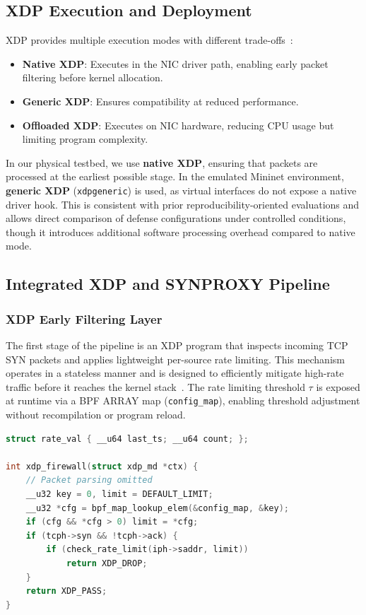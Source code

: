 \documentclass[conference]{IEEEtran}
\begin{document}
\subsection{XDP Execution and Deployment}

XDP provides multiple execution modes with different
trade-offs~\cite{XDPmode,LinuxKernelDoc}:

\begin{itemize}
  \item \textbf{Native XDP}: Executes in the NIC driver path, enabling
        early packet filtering before kernel allocation.
  \item \textbf{Generic XDP}: Ensures compatibility at reduced performance.
  \item \textbf{Offloaded XDP}: Executes on NIC hardware, reducing CPU
        usage but limiting program complexity.
\end{itemize}

In our physical testbed, we use \textbf{native XDP}, ensuring that packets
are processed at the earliest possible stage.
In the emulated Mininet environment, \textbf{generic XDP}
(\texttt{xdpgeneric}) is used, as virtual interfaces do not expose a
native driver hook.
This is consistent with prior reproducibility-oriented evaluations and
allows direct comparison of defense configurations under controlled
conditions, though it introduces additional software processing overhead
compared to native mode.

\subsection{Integrated XDP and SYNPROXY Pipeline}
\label{subsec:architecture}

\subsubsection{XDP Early Filtering Layer}

The first stage of the pipeline is an XDP program that inspects incoming
TCP SYN packets and applies lightweight per-source rate limiting.
This mechanism operates in a stateless manner and is designed to
efficiently mitigate high-rate traffic before it reaches the kernel
stack~\cite{HighPerfXDP}.
The rate limiting threshold $\tau$ is exposed at runtime via a BPF ARRAY
map (\texttt{config\_map}), enabling threshold adjustment without
recompilation or program reload.

\begin{lstlisting}[language=C]
struct rate_val { __u64 last_ts; __u64 count; };

int xdp_firewall(struct xdp_md *ctx) {
    // Packet parsing omitted
    __u32 key = 0, limit = DEFAULT_LIMIT;
    __u32 *cfg = bpf_map_lookup_elem(&config_map, &key);
    if (cfg && *cfg > 0) limit = *cfg;
    if (tcph->syn && !tcph->ack) {
        if (check_rate_limit(iph->saddr, limit))
            return XDP_DROP;
    }
    return XDP_PASS;
}
\end{lstlisting}
\end{document}
